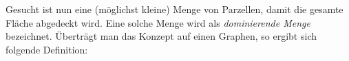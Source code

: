 
Gesucht ist nun eine (möglichst kleine) Menge von Parzellen, damit die gesamte Fläche abgedeckt wird. Eine solche Menge wird als \emph{dominierende Menge} bezeichnet. Überträgt man das Konzept auf einen Graphen, so ergibt sich folgende Definition:



%    
%
%
%
%

